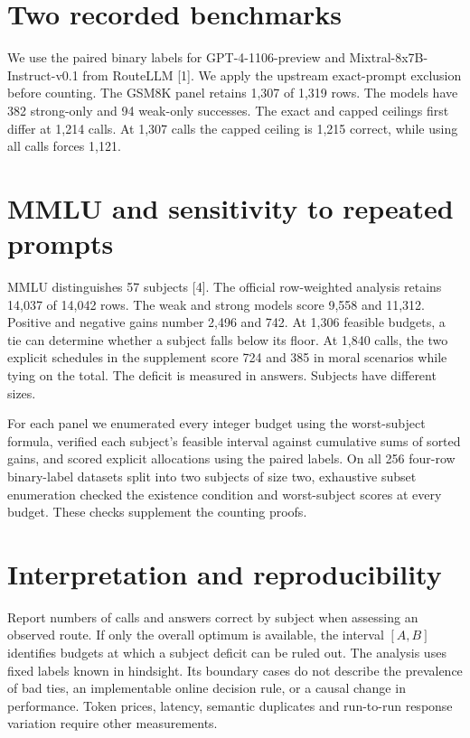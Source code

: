 \documentclass[11pt]{article}
\begin{document}
\section{Two recorded benchmarks}
We use the paired binary labels for GPT-4-1106-preview and Mixtral-8x7B-Instruct-v0.1 from RouteLLM [1]. We apply the upstream exact-prompt exclusion before counting. The GSM8K panel retains 1,307 of 1,319 rows. The models have 382 strong-only and 94 weak-only successes. The exact and capped ceilings first differ at 1,214 calls. At 1,307 calls the capped ceiling is 1,215 correct, while using all calls forces 1,121.

\newpage
\section{MMLU and sensitivity to repeated prompts}
MMLU distinguishes 57 subjects [4]. The official row-weighted analysis retains 14,037 of 14,042 rows. The weak and strong models score 9,558 and 11,312. Positive and negative gains number 2,496 and 742. At 1,306 feasible budgets, a tie can determine whether a subject falls below its floor. At 1,840 calls, the two explicit schedules in the supplement score 724 and 385 in moral scenarios while tying on the total. The deficit is measured in answers. Subjects have different sizes.



For each panel we enumerated every integer budget using the worst-subject formula, verified each subject's feasible interval against cumulative sums of sorted gains, and scored explicit allocations using the paired labels. On all 256 four-row binary-label datasets split into two subjects of size two, exhaustive subset enumeration checked the existence condition and worst-subject scores at every budget. These checks supplement the counting proofs.

\section{Interpretation and reproducibility}
Report numbers of calls and answers correct by subject when assessing an observed route. If only the overall optimum is available, the interval $[A,B]$ identifies budgets at which a subject deficit can be ruled out. The analysis uses fixed labels known in hindsight. Its boundary cases do not describe the prevalence of bad ties, an implementable online decision rule, or a causal change in performance. Token prices, latency, semantic duplicates and run-to-run response variation require other measurements.
\end{document}
